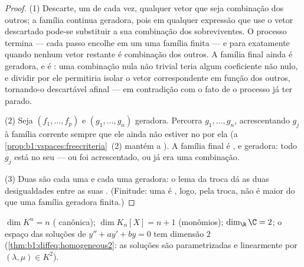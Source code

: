\begin{proof}
(1) Descarte, um de cada vez, qualquer vetor que seja combinação
dos outros; a família continua geradora, pois em qualquer expressão
que use o vetor descartado pode-se substituir a sua combinação dos
sobreviventes. O processo termina --- cada passo encolhe em um uma
família finita --- e para exatamente quando nenhum vetor restante
é combinação dos outros. A família final ainda é geradora, e é
: uma combinação nula não trivial teria algum coeficiente não
nulo, e dividir por ele permitiria isolar o vetor correspondente em
função dos outros, tornando-o descartável afinal --- em contradição
com o fato de o processo já ter parado.

(2) Seja $(f_1, \dots, f_p)$  e $(g_1, \dots, g_n)$ geradora. Percorra $g_1, \dots, g_n$,
acrescentando $g_j$ à família corrente sempre que ele ainda não
estiver no  por ela (a \cref{prop:b1:vspaces:freecriteria}~(2) mantém a ). A família final é , e geradora: todo $g_j$ está no seu
 --- ou foi acrescentado, ou já era uma combinação.

(3) Duas  são cada uma  e cada uma geradora: o lema da
troca dá as duas desigualdades entre as suas .
(Finitude: uma  é , logo, pela troca, não é maior do que
uma família geradora finita.)
\end{proof}

\begin{example}\label{ex:b1:findim:dims}
$\dim K^n = n$ ( canônica); $\dim K_n[X] = n + 1$ (monômios); $\dim_\R \C = 2$; o espaço das
soluções de $y'' + ay' + by = 0$ tem dimensão $2$ (\cref{thm:b1:diffeq:homogeneous2}: as soluções são
parametrizadas  e linearmente por $(\lambda, \mu) \in K^2$).
\end{example}

